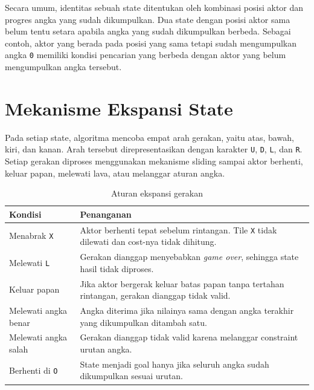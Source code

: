Secara umum, identitas sebuah state ditentukan oleh kombinasi posisi aktor dan progres angka yang sudah dikumpulkan. 
Dua state dengan posisi aktor sama belum tentu setara apabila angka yang sudah dikumpulkan berbeda. 
Sebagai contoh, aktor yang berada pada posisi yang sama tetapi sudah mengumpulkan angka \texttt{0} memiliki kondisi pencarian yang berbeda dengan aktor yang belum mengumpulkan angka tersebut.

\section{Mekanisme Ekspansi State}

Pada setiap state, algoritma mencoba empat arah gerakan, yaitu atas, bawah, kiri, dan kanan. 
Arah tersebut direpresentasikan dengan karakter \texttt{U}, \texttt{D}, \texttt{L}, dan \texttt{R}. 
Setiap gerakan diproses menggunakan mekanisme sliding sampai aktor berhenti, keluar papan, melewati lava, atau melanggar aturan angka.

\begin{table}[H]
	\centering
	\caption{Aturan ekspansi gerakan}
	\begin{tabular}{|p{3.5cm}|p{10.5cm}|}
		\hline
		\rowcolor{gray!20}
		\textbf{Kondisi} & \textbf{Penanganan} \\
		\hline
		Menabrak \texttt{X} & Aktor berhenti tepat sebelum rintangan. Tile \texttt{X} tidak dilewati dan cost-nya tidak dihitung. \\
		\hline
		Melewati \texttt{L} & Gerakan dianggap menyebabkan \textit{game over}, sehingga state hasil tidak diproses. \\
		\hline
		Keluar papan & Jika aktor bergerak keluar batas papan tanpa tertahan rintangan, gerakan dianggap tidak valid. \\
		\hline
		Melewati angka benar & Angka diterima jika nilainya sama dengan angka terakhir yang dikumpulkan ditambah satu. \\
		\hline
		Melewati angka salah & Gerakan dianggap tidak valid karena melanggar constraint urutan angka. \\
		\hline
		Berhenti di \texttt{O} & State menjadi goal hanya jika seluruh angka sudah dikumpulkan sesuai urutan. \\
		\hline
	\end{tabular}
\end{table}

